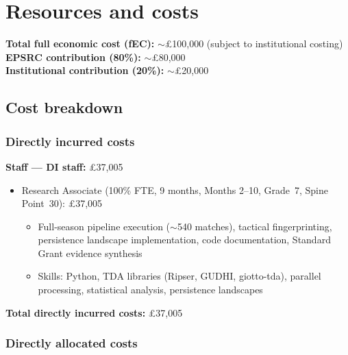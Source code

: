 \section{Resources and costs}

\textbf{Total full economic cost (fEC):} $\sim$\pounds100{,}000 (subject to institutional costing) \\
\textbf{EPSRC contribution (80\%):} $\sim$\pounds80{,}000 \\
\textbf{Institutional contribution (20\%):} $\sim$\pounds20{,}000

\subsection{Cost breakdown}

\subsubsection{Directly incurred costs}

\textbf{Staff --- DI staff:} \pounds37{,}005
\begin{itemize}
  \item Research Associate (100\% FTE, 9 months, Months 2--10, Grade~7, Spine Point~30): \pounds37{,}005
  \begin{itemize}[nosep]
    \item Full-season pipeline execution ($\sim$540 matches), tactical fingerprinting, persistence landscape implementation, code documentation, Standard Grant evidence synthesis
    \item Skills: Python, TDA libraries (Ripser, GUDHI, giotto-tda), parallel processing, statistical analysis, persistence landscapes
  \end{itemize}
\end{itemize}

\textbf{Total directly incurred costs:} \pounds37{,}005

\subsubsection{Directly allocated costs}

